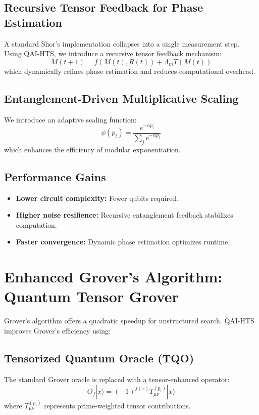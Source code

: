 \documentclass[12pt]{article}
\begin{document}
\subsection{Recursive Tensor Feedback for Phase Estimation}
A standard Shor’s implementation collapses into a single measurement step. Using QAI-HTS, we introduce a recursive tensor feedback mechanism:
\begin{equation}
    M(t+1) = f(M(t), R(t)) + \Lambda_m T(M(t))
\end{equation}
which dynamically refines phase estimation and reduces computational overhead.

\subsection{Entanglement-Driven Multiplicative Scaling}
We introduce an adaptive scaling function:
\begin{equation}
    \phi(p_i) = \frac{e^{-\alpha p_i}}{\sum_{j} e^{-\alpha p_j}}
\end{equation}
which enhances the efficiency of modular exponentiation.

\subsection{Performance Gains}
\begin{itemize}
    \item \textbf{Lower circuit complexity:} Fewer qubits required.
    \item \textbf{Higher noise resilience:} Recursive entanglement feedback stabilizes computation.
    \item \textbf{Faster convergence:} Dynamic phase estimation optimizes runtime.
\end{itemize}

\section{Enhanced Grover’s Algorithm: Quantum Tensor Grover}
Grover’s algorithm offers a quadratic speedup for unstructured search. QAI-HTS improves Grover’s efficiency using:

\subsection{Tensorized Quantum Oracle (TQO)}
The standard Grover oracle is replaced with a tensor-enhanced operator:
\begin{equation}
    O_f | x \rangle = (-1)^{f(x)} T_{\mu\nu}^{(p_i)} | x \rangle
\end{equation}
where $T_{\mu\nu}^{(p_i)}$ represents prime-weighted tensor contributions.
\end{document}
